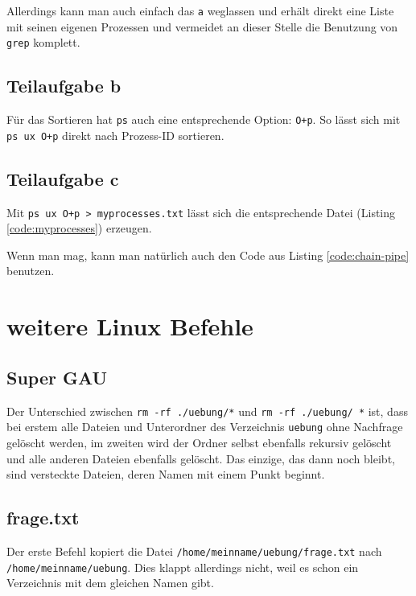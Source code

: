 Allerdings kann man auch einfach das \texttt{a} weglassen und erhält direkt eine Liste mit seinen eigenen Prozessen und vermeidet an dieser Stelle die Benutzung von \texttt{grep} komplett.


\subsection{Teilaufgabe b}
Für das Sortieren hat \texttt{ps} auch eine entsprechende Option: \texttt{O+p}. So lässt sich mit \texttt{ps ux O+p} direkt nach Prozess-ID sortieren.

\subsection{Teilaufgabe c}
Mit \verb#ps ux O+p > myprocesses.txt# lässt sich die entsprechende Datei (Listing \ref{code:myprocesses}) erzeugen.



Wenn man mag, kann man natürlich auch den Code aus Listing \ref{code:chain-pipe} benutzen.


\section{weitere Linux Befehle}

\subsection{Super GAU}

Der Unterschied zwischen \verb#rm -rf ./uebung/*# und \verb#rm -rf ./uebung/ *# ist, dass bei erstem alle Dateien und Unterordner des Verzeichnis \texttt{uebung} ohne Nachfrage gelöscht werden, im zweiten wird der Ordner selbst ebenfalls rekursiv gelöscht und alle anderen Dateien ebenfalls gelöscht. Das einzige, das dann noch bleibt, sind versteckte Dateien, deren Namen mit einem Punkt beginnt.

\subsection{frage.txt}

Der erste Befehl kopiert die Datei \texttt{/home/meinname/uebung/frage.txt} nach \texttt{/home/meinname/uebung}. Dies klappt allerdings nicht, weil es schon ein Verzeichnis mit dem gleichen Namen gibt.

